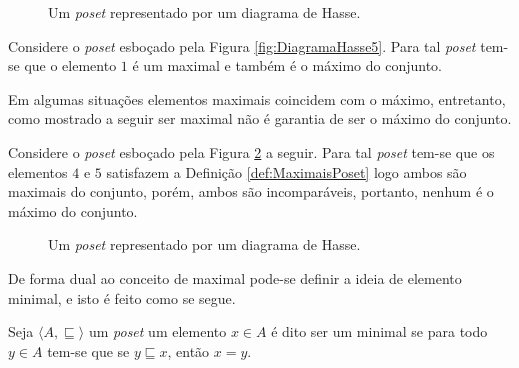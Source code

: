 \begin{figure}[h]
  \centering
  \caption{Um \textit{poset} representado por um diagrama de Hasse.}
  \label{fig:DiagramaHasse7}
\end{figure}

\begin{exemplo}
	Considere o \textit{poset} esboçado pela Figura \ref{fig:DiagramaHasse5}. Para tal \textit{poset} tem-se que o elemento $1$ é um maximal e também é o máximo do conjunto.
\end{exemplo}

Em algumas situações elementos maximais coincidem com o máximo, entretanto, como mostrado a seguir ser maximal não é garantia de ser o máximo do conjunto.

\begin{exemplo}
  Considere o \textit{poset} esboçado pela Figura \ref{fig:DiagramaHasse8} a seguir. Para tal \textit{poset} tem-se que os elementos $4$ e $5$ satisfazem a Definição \ref{def:MaximaisPoset} logo ambos são maximais do conjunto, porém, ambos são incomparáveis, portanto, nenhum é o máximo do conjunto.
\end{exemplo}

\begin{figure}[h]
		\centering
  \caption{Um \textit{poset} representado por um diagrama de Hasse.}
  \label{fig:DiagramaHasse8}
\end{figure}

De forma dual ao conceito de maximal pode-se definir a ideia de elemento minimal, e isto é feito como se segue.

\begin{definicao}\label{def:MinimalPoset}
	Seja $\langle A, \sqsubseteq \rangle$ um \textit{poset}  um elemento $x \in A$ é dito ser um minimal se para todo $y \in A$ tem-se que se $y\sqsubseteq x$, então $x = y$.
\end{definicao}

